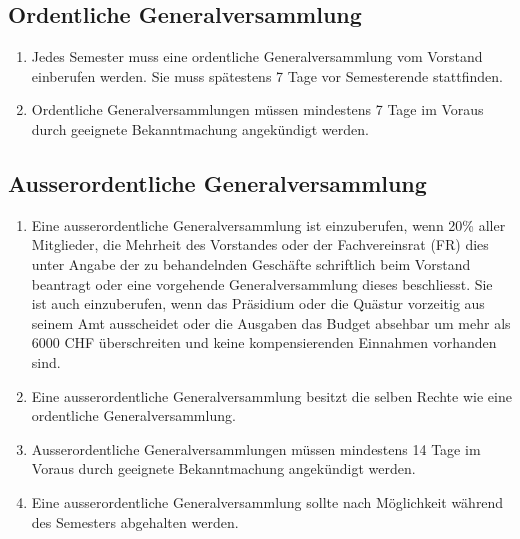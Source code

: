 \subsection{Ordentliche Generalversammlung}
\begin{enumerate}
\item Jedes Semester muss eine ordentliche Generalversammlung vom Vorstand einberufen werden. Sie muss spätestens 7 Tage vor Semesterende stattfinden.
\item Ordentliche Generalversammlungen müssen mindestens 7 Tage im Voraus durch geeignete Bekanntmachung angekündigt werden.
\end{enumerate}

\subsection{Ausserordentliche Generalversammlung}
\begin{enumerate}
\item Eine ausserordentliche Generalversammlung ist einzuberufen, wenn 20\% aller Mitglieder, die Mehrheit des Vorstandes oder der Fachvereinsrat (FR) dies unter Angabe der zu behandelnden Geschäfte schriftlich beim Vorstand beantragt oder eine vorgehende Generalversammlung dieses beschliesst. Sie ist auch einzuberufen, wenn das Präsidium oder die Quästur vorzeitig aus seinem Amt ausscheidet oder die Ausgaben das Budget absehbar um mehr als 6000 CHF überschreiten und keine kompensierenden Einnahmen vorhanden sind.
\item Eine ausserordentliche Generalversammlung besitzt die selben Rechte wie eine ordentliche Generalversammlung.
\item Ausserordentliche Generalversammlungen müssen mindestens 14 Tage im Voraus durch geeignete Bekanntmachung angekündigt werden.
\item Eine ausserordentliche Generalversammlung sollte nach Möglichkeit während des Semesters abgehalten werden.
\end{enumerate}

